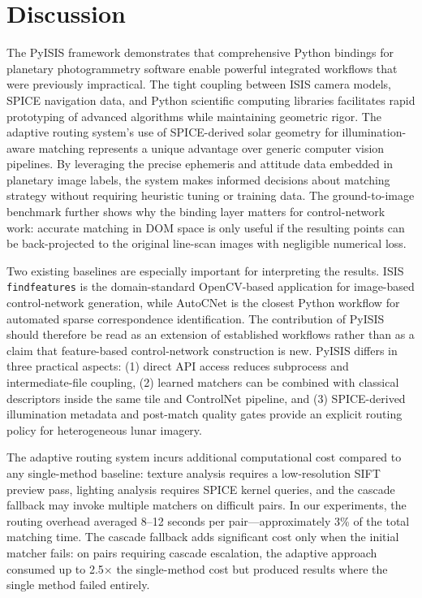 \documentclass[lettersize,journal]{IEEEtran}
\newcommand{\pyisis}{PyISIS}
\begin{document}
\section{Discussion}\label{sec:discussion}

The \pyisis{} framework demonstrates that comprehensive Python bindings for planetary photogrammetry software enable powerful integrated workflows that were previously impractical. The tight coupling between ISIS camera models, SPICE navigation data, and Python scientific computing libraries facilitates rapid prototyping of advanced algorithms while maintaining geometric rigor. The adaptive routing system's use of SPICE-derived solar geometry for illumination-aware matching represents a unique advantage over generic computer vision pipelines. By leveraging the precise ephemeris and attitude data embedded in planetary image labels, the system makes informed decisions about matching strategy without requiring heuristic tuning or training data. The ground-to-image benchmark further shows why the binding layer matters for control-network work: accurate matching in DOM space is only useful if the resulting points can be back-projected to the original line-scan images with negligible numerical loss.

Two existing baselines are especially important for interpreting the results. ISIS \texttt{findfeatures} is the domain-standard OpenCV-based application for image-based control-network generation, while AutoCNet \cite{laura2018autocnet} is the closest Python workflow for automated sparse correspondence identification. The contribution of \pyisis{} should therefore be read as an extension of established workflows rather than as a claim that feature-based control-network construction is new. \pyisis{} differs in three practical aspects: (1) direct API access reduces subprocess and intermediate-file coupling, (2) learned matchers can be combined with classical descriptors inside the same tile and ControlNet pipeline, and (3) SPICE-derived illumination metadata and post-match quality gates provide an explicit routing policy for heterogeneous lunar imagery.

The adaptive routing system incurs additional computational cost compared to any single-method baseline: texture analysis requires a low-resolution SIFT preview pass, lighting analysis requires SPICE kernel queries, and the cascade fallback may invoke multiple matchers on difficult pairs. In our experiments, the routing overhead averaged 8--12 seconds per pair—approximately 3\% of the total matching time. The cascade fallback adds significant cost only when the initial matcher fails: on pairs requiring cascade escalation, the adaptive approach consumed up to 2.5$\times$ the single-method cost but produced results where the single method failed entirely.
\end{document}
